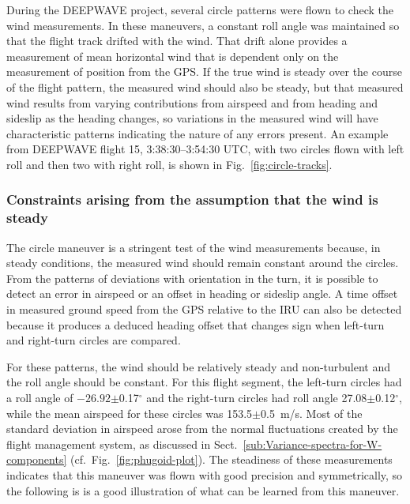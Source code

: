 \documentclass[12pt,twoside,english]{article}\usepackage[]{graphicx}\usepackage[]{color}
\let\OrgIndex\index
\renewcommand*{\index}[1]{\OrgIndex{#1}}
\begin{document}
During the DEEPWAVE project, several circle patterns were flown to check the wind measurements. In these maneuvers, a constant roll angle was maintained so that the flight track drifted with the wind. That drift alone provides a measurement of mean horizontal wind that is dependent only on the measurement of position from the GPS. If the true wind is steady over the course of the flight pattern, the measured wind should also be steady, but that measured wind results from varying contributions from airspeed and from heading and sideslip as the heading changes, so variations in the measured wind will have characteristic patterns indicating the nature of any errors present. An example from DEEPWAVE flight 15, 3:38:30--3:54:30 UTC, with two circles flown with left roll and then two with right roll, is shown in Fig.~\ref{fig:circle-tracks}. 
% 

\subsubsection{Constraints arising from the assumption that the wind is steady}

The circle maneuver is a stringent test of the wind measurements because, in steady conditions, the measured wind should remain constant around the circles. From the patterns of deviations with orientation in the turn, it is possible to detect an error in airspeed or an offset in heading or sideslip angle. A time offset in measured ground speed from the GPS relative to the IRU can also be detected because it produces a deduced heading offset that changes sign when left-turn and right-turn circles are compared. 

For these patterns, the wind should be relatively steady and non-turbulent and the roll angle should be constant. For this flight segment, the left-turn circles had a roll angle of \ensuremath{-26.92}$\pm$0.17$^{\circ}$ and the right-turn circles had roll angle 27.08$\pm$0.12$^{\circ}$, while the mean airspeed for these circles was 153.5$\pm$0.5~m/s. Most of the standard deviation in airspeed arose from the normal fluctuations created by the flight management system, as discussed in Sect.~\ref{sub:Variance-spectra-for-W-components} (cf.~Fig.~\ref{fig:phugoid-plot}). The steadiness of these measurements indicates that this maneuver was flown with good precision and symmetrically, so the following is is a good illustration of what can be learned from this maneuver. 
\end{document}
